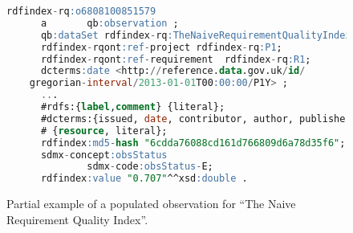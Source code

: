 \begin{figure}[!ht]
\begin{lstlisting}[language=SQL,basicstyle=\scriptsize]  
rdfindex-rq:o6808100851579
      a       qb:observation ;
      qb:dataSet rdfindex-rq:TheNaiveRequirementQualityIndex  ;
      rdfindex-rqont:ref-project rdfindex-rq:P1;
      rdfindex-rqont:ref-requirement  rdfindex-rq:R1;
      dcterms:date <http://reference.data.gov.uk/id/
	gregorian-interval/2013-01-01T00:00:00/P1Y> ;
      ...
      #rdfs:{label,comment} {literal};
      #dcterms:{issued, date, contributor, author, publisher, identifier} 
      #	{resource, literal};
      rdfindex:md5-hash "6cdda76088cd161d766809d6a78d35f6";
      sdmx-concept:obsStatus
              sdmx-code:obsStatus-E;
      rdfindex:value "0.707"^^xsd:double .
\end{lstlisting}
\caption{Partial example of a populated observation for ``The Naive Requirement Quality Index''.}
 \label{fig:generated observation}
\end{figure}


